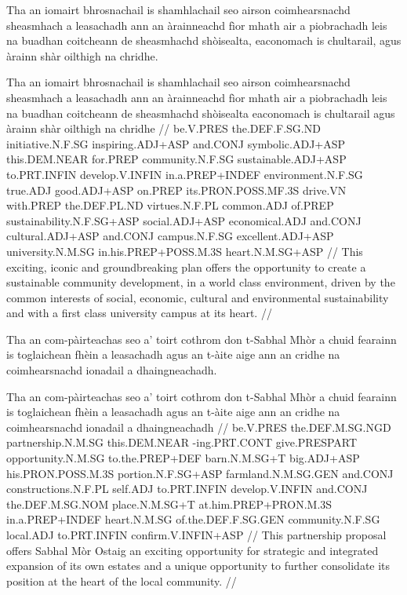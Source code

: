 \documentclass[a4paper,10pt]{article}
\begin{document}
\ex
\begingl
\glpre Tha an iomairt bhrosnachail is shamhlachail seo airson coimhearsnachd sheasmhach a leasachadh ann an àrainneachd fìor mhath air a piobrachadh leis na buadhan coitcheann de sheasmhachd shòisealta, eaconomach is chultarail, agus àrainn shàr oilthigh na chridhe. 

\vspace{4mm}
\gla Tha an iomairt bhrosnachail is shamhlachail seo airson coimhearsnachd sheasmhach a leasachadh {ann an} àrainneachd fìor mhath air a piobrachadh leis na buadhan coitcheann de sheasmhachd shòisealta eaconomach is chultarail agus àrainn shàr oilthigh na chridhe  //
\glb be.V.PRES the.DEF.F.SG.ND initiative.N.F.SG inspiring.ADJ+ASP and.CONJ symbolic.ADJ+ASP this.DEM.NEAR for.PREP community.N.F.SG sustainable.ADJ+ASP to.PRT.INFIN develop.V.INFIN in.a.PREP+INDEF environment.N.F.SG true.ADJ good.ADJ+ASP on.PREP its.PRON.POSS.MF.3S drive.VN with.PREP the.DEF.PL.ND virtues.N.F.PL common.ADJ of.PREP sustainability.N.F.SG+ASP social.ADJ+ASP economical.ADJ and.CONJ cultural.ADJ+ASP and.CONJ campus.N.F.SG excellent.ADJ+ASP university.N.M.SG in.his.PREP+POSS.M.3S heart.N.M.SG+ASP  //
\glft This exciting, iconic and groundbreaking plan offers the opportunity to create a sustainable community development, in a world class environment, driven by the common interests of social, economic, cultural and environmental sustainability and with a first class university campus at its heart. //
\endgl
\xe

\ex
\begingl
\glpre Tha an com-pàirteachas seo a' toirt cothrom don t-Sabhal Mhòr a chuid fearainn is toglaichean fhèin a leasachadh agus an t-àite aige ann an cridhe na coimhearsnachd ionadail a dhaingneachadh. 

\vspace{4mm}
\gla Tha an com-pàirteachas seo a' toirt cothrom don t-Sabhal Mhòr a chuid fearainn is toglaichean fhèin a leasachadh agus an t-àite aige {ann an} cridhe na coimhearsnachd ionadail a dhaingneachadh  //
\glb be.V.PRES the.DEF.M.SG.NGD partnership.N.M.SG this.DEM.NEAR -ing.PRT.CONT give.PRESPART opportunity.N.M.SG to.the.PREP+DEF barn.N.M.SG+T big.ADJ+ASP his.PRON.POSS.M.3S portion.N.F.SG+ASP farmland.N.M.SG.GEN and.CONJ constructions.N.F.PL self.ADJ to.PRT.INFIN develop.V.INFIN and.CONJ the.DEF.M.SG.NOM place.N.M.SG+T at.him.PREP+PRON.M.3S in.a.PREP+INDEF heart.N.M.SG of.the.DEF.F.SG.GEN community.N.F.SG local.ADJ to.PRT.INFIN confirm.V.INFIN+ASP  //
\glft This partnership proposal offers Sabhal Mòr Ostaig an exciting opportunity for strategic and integrated expansion of its own estates and a unique opportunity to further consolidate its position at the heart of the local community. //
\endgl
\xe
\end{document}
